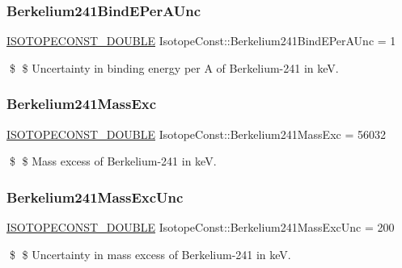 \subsubsection{\texorpdfstring{Berkelium241\+Bind\+E\+Per\+A\+Unc}{Berkelium241BindEPerAUnc}}
{\footnotesize\ttfamily \mbox{\hyperlink{group___isotope_const-_macros_ga8f45a7272ce02c0b4c65c44636ed719a}{I\+S\+O\+T\+O\+P\+E\+C\+O\+N\+S\+T\+\_\+\+D\+O\+U\+B\+LE}} Isotope\+Const\+::\+Berkelium241\+Bind\+E\+Per\+A\+Unc = 1}

\$ \$ Uncertainty in binding energy per A of Berkelium-\/241 in keV. \mbox{\label{group___isotope_const-_berkelium-_bk241_ga6a5af31bff542c02ec1537115c52093e}} 
\subsubsection{\texorpdfstring{Berkelium241\+Mass\+Exc}{Berkelium241MassExc}}
{\footnotesize\ttfamily \mbox{\hyperlink{group___isotope_const-_macros_ga8f45a7272ce02c0b4c65c44636ed719a}{I\+S\+O\+T\+O\+P\+E\+C\+O\+N\+S\+T\+\_\+\+D\+O\+U\+B\+LE}} Isotope\+Const\+::\+Berkelium241\+Mass\+Exc = 56032}

\$ \$ Mass excess of Berkelium-\/241 in keV. \mbox{\label{group___isotope_const-_berkelium-_bk241_ga5bc571cba4089e70448153514c618418}} 
\subsubsection{\texorpdfstring{Berkelium241\+Mass\+Exc\+Unc}{Berkelium241MassExcUnc}}
{\footnotesize\ttfamily \mbox{\hyperlink{group___isotope_const-_macros_ga8f45a7272ce02c0b4c65c44636ed719a}{I\+S\+O\+T\+O\+P\+E\+C\+O\+N\+S\+T\+\_\+\+D\+O\+U\+B\+LE}} Isotope\+Const\+::\+Berkelium241\+Mass\+Exc\+Unc = 200}

\$ \$ Uncertainty in mass excess of Berkelium-\/241 in keV. \mbox{\label{group___isotope_const-_berkelium-_bk241_ga1b3771bc37d42e0f12173000f1f1d01e}} 
